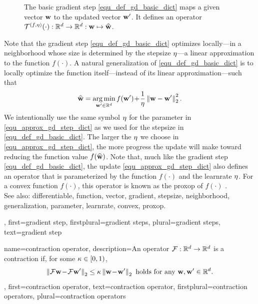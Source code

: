 {{\begin{figure}[H]
\begin{center}
\begin{tikzpicture}[scale=0.8]
				\end{tikzpicture}
			\end{center}
			\caption{The basic \gls{gradient} step \eqref{equ_def_gd_basic_dict} maps a given \gls{vector} $\weights$ 
			to the updated \gls{vector} $\weights'$. It defines an operator 
			$\mathcal{T}^{(f,\lrate)}(\cdot): \mathbb{R}^{\nrfeatures} \rightarrow \mathbb{R}^{\nrfeatures}:
			 \weights \mapsto \widehat{\weights}$.}
			\label{fig_basic_GD_step_single_dict}
		\end{figure}
		Note that the \gls{gradient} step \eqref{equ_def_gd_basic_dict} optimizes locally—in a \gls{neighborhood} whose size is 
		determined by the \gls{stepsize} $\lrate$—a linear approximation 
		to the \gls{function} $f(\cdot)$. A natural \gls{generalization} of \eqref{equ_def_gd_basic_dict} is to locally 
		optimize the \gls{function} itself—instead of its linear approximation—such that
		\begin{align} 
		\label{equ_approx_gd_step_dict}
		\widehat{\weights} = \aargmin_{\weights' \in \mathbb{R}^{\dimlocalmodel}} f(\weights')\!+\!\frac{1}{\lrate}\normgeneric{\weights-\weights'}{2}^2. 
		\end{align}
		We intentionally use the same symbol $\lrate$ for the \gls{parameter} in \eqref{equ_approx_gd_step_dict} 
		as we used for the \gls{stepsize} in \eqref{equ_def_gd_basic_dict}. The larger the $\lrate$ we choose in 
		\eqref{equ_approx_gd_step_dict}, the more progress the update will make toward reducing the 
		\gls{function} value $f(\widehat{\weights})$. Note that, much like the \gls{gradient} step \eqref{equ_def_gd_basic_dict}, 
		the update \eqref{equ_approx_gd_step_dict} also defines an operator 
		that is parameterized by the \gls{function} $f(\cdot)$ and the \gls{learnrate} $\lrate$. For a \gls{convex} \gls{function}  
		$f(\cdot)$, this operator is known as the \gls{proxop} of $f(\cdot)$ \cite{ProximalMethods}. 
					\\ 
		See also: \gls{differentiable}, \gls{function}, \gls{vector}, \gls{gradient}, \gls{stepsize}, \gls{neighborhood}, \gls{generalization}, \gls{parameter}, \gls{learnrate}, \gls{convex}, \gls{proxop}.},
	first={gradient step},
	firstplural={gradient steps},
	plural={gradient steps},
	text={gradient step}
}

{name={contraction operator},
	description={An operator $\fixedpointop: \mathbb{R}^{\nrfeatures} \rightarrow \mathbb{R}^{\nrfeatures}$
		is a contraction if, for some $\contractfac \in [0,1)$,
		\begin{equation} 
			\nonumber
			\normgeneric{ \fixedpointop \weights\!-\!\fixedpointop \weights'}{2}  \leq  \contractfac	\normgeneric{\weights\!-\!\weights'}{2} \mbox{ holds for any } \weights,\weights' \in \mathbb{R}^{\nrfeatures}.
		\end{equation}
	},
	first={contraction operator},
	text={contraction operator}, 
	firstplural={contraction operators}, 
	plural={contraction operators}
}
	

